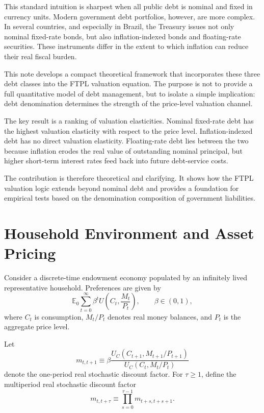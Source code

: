\documentclass[12pt,a4paper]{article}
\begin{document}
This standard intuition is sharpest when all public debt is nominal and fixed in currency
units. Modern government debt portfolios, however, are more complex. In several
countries, and especially in Brazil, the Treasury issues not only nominal fixed-rate bonds,
but also inflation-indexed bonds and floating-rate securities. These instruments differ in
the extent to which inflation can reduce their real fiscal burden.

This note develops a compact theoretical framework that incorporates these three debt
classes into the FTPL valuation equation. The purpose is not to provide a full quantitative
model of debt management, but to isolate a simple implication: debt denomination
determines the strength of the price-level valuation channel.

The key result is a ranking of valuation elasticities. Nominal fixed-rate debt has the
highest valuation elasticity with respect to the price level. Inflation-indexed debt has no
direct valuation elasticity. Floating-rate debt lies between the two because inflation erodes
the real value of outstanding nominal principal, but higher short-term interest rates feed
back into future debt-service costs.

The contribution is therefore theoretical and clarifying. It shows how the FTPL
valuation logic extends beyond nominal debt and provides a foundation for empirical
tests based on the denomination composition of government liabilities.

\section{Household Environment and Asset Pricing}

Consider a discrete-time endowment economy populated by an infinitely lived
representative household. Preferences are given by
\begin{equation}
\mathbb{E}_0
\sum_{t=0}^{\infty}
\beta^t
U\left(C_t,\frac{M_t}{P_t}\right),
\qquad
\beta \in (0,1),
\end{equation}
where $C_t$ is consumption, $M_t/P_t$ denotes real money balances, and $P_t$ is the
aggregate price level.

Let
\begin{equation}
m_{t,t+1}
\equiv
\beta
\frac{
U_C(C_{t+1},M_{t+1}/P_{t+1})
}{
U_C(C_t,M_t/P_t)
}
\end{equation}
denote the one-period real stochastic discount factor. For $\tau \geq 1$, define the
multiperiod real stochastic discount factor
\begin{equation}
m_{t,t+\tau}
\equiv
\prod_{s=0}^{\tau-1} m_{t+s,t+s+1}.
\end{equation}
\end{document}

